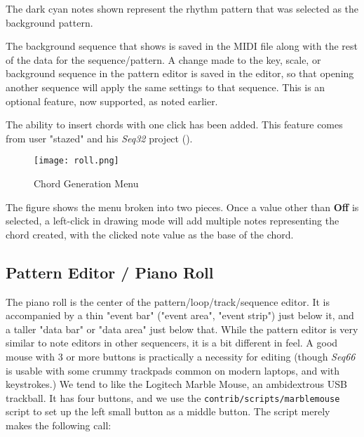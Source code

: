    The dark cyan notes shown represent the rhythm pattern that was selected as
   the background pattern.

   The background sequence that shows is saved in the MIDI file
   along with the rest of the data for the sequence/pattern.
   A change made to the key, scale, or background sequence in
   the pattern editor is saved in the editor, so that opening another sequence
   will apply the same settings to that sequence.  This is an optional feature,
   now supported, as noted earlier.

   The ability to insert chords with one click has been added.
   This feature comes from user "stazed"
   and his \textsl{Seq32} project (\cite{seq32}).

\begin{figure}[H]
   \centering 
   \texttt{[image: roll.png]}
   \caption{Chord Generation Menu}
   \label{fig:pattern_editor_chords_menu}
\end{figure}

   The figure shows the menu broken into two pieces.
   Once a value other than \textbf{Off} is selected, a left-click
   in drawing mode will add multiple notes representing the chord
   created, with the clicked note value as the base of the chord.

\subsection{Pattern Editor / Piano Roll}
\label{subsec:pattern_editor_piano_roll}

   The piano roll is the center of the pattern/loop/track/sequence editor.
   It is accompanied by a
   thin "event bar" ("event area", "event strip") just below it,
   and a taller "data bar" or "data area" just below that.  While the pattern
   editor is very similar to note editors in other sequencers, it is a bit
   different in feel.  A good mouse with 3 or more buttons is practically a
   necessity for editing (though \textsl{Seq66} is usable
   with some crummy trackpads common on modern laptops, and
   with keystrokes.) We tend to like the Logitech Marble Mouse, an ambidextrous
   USB trackball.  It has four buttons, and we use the
   \texttt{contrib/scripts/marblemouse} script to set up the left small button
   as a middle button.  The script merely makes the following call:

